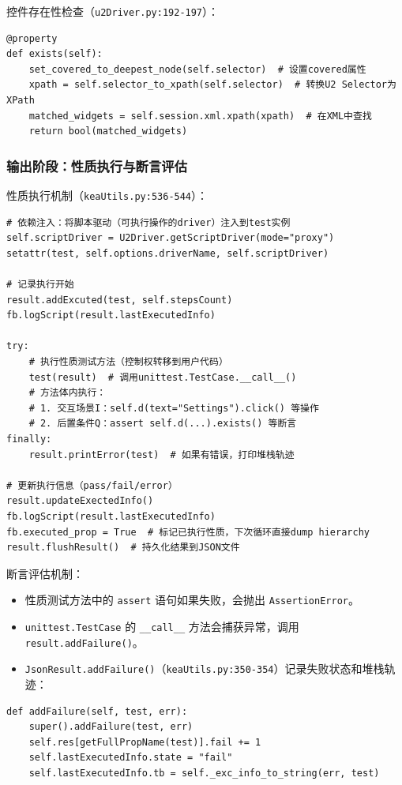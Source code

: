 \documentclass[a4paper, zihao=-4]{ctexart}
\newcommand{\bff}[1]{{\heiti #1}}
\begin{document}
\bff{控件存在性检查}（\texttt{u2Driver.py:192-197}）：

\begin{lstlisting}
@property
def exists(self):
    set_covered_to_deepest_node(self.selector)  # 设置covered属性
    xpath = self.selector_to_xpath(self.selector)  # 转换U2 Selector为XPath
    matched_widgets = self.session.xml.xpath(xpath)  # 在XML中查找
    return bool(matched_widgets)
\end{lstlisting}

\subsubsection{输出阶段：性质执行与断言评估}

\bff{性质执行机制}（\texttt{keaUtils.py:536-544}）：

\begin{lstlisting}
# 依赖注入：将脚本驱动（可执行操作的driver）注入到test实例
self.scriptDriver = U2Driver.getScriptDriver(mode="proxy")
setattr(test, self.options.driverName, self.scriptDriver)

# 记录执行开始
result.addExcuted(test, self.stepsCount)
fb.logScript(result.lastExecutedInfo)

try:
    # 执行性质测试方法（控制权转移到用户代码）
    test(result)  # 调用unittest.TestCase.__call__()
    # 方法体内执行：
    # 1. 交互场景I：self.d(text="Settings").click() 等操作
    # 2. 后置条件Q：assert self.d(...).exists() 等断言
finally:
    result.printError(test)  # 如果有错误，打印堆栈轨迹

# 更新执行信息（pass/fail/error）
result.updateExectedInfo()
fb.logScript(result.lastExecutedInfo)
fb.executed_prop = True  # 标记已执行性质，下次循环直接dump hierarchy
result.flushResult()  # 持久化结果到JSON文件
\end{lstlisting}

\bff{断言评估机制}：

\begin{itemize}
    \item 性质测试方法中的 \texttt{assert} 语句如果失败，会抛出 \texttt{AssertionError}。
    \item \texttt{unittest.TestCase} 的 \texttt{\_\_call\_\_} 方法会捕获异常，调用 \texttt{result.addFailure()}。
    \item \texttt{JsonResult.addFailure()}（\texttt{keaUtils.py:350-354}）记录失败状态和堆栈轨迹：
\end{itemize}

\begin{lstlisting}
def addFailure(self, test, err):
    super().addFailure(test, err)
    self.res[getFullPropName(test)].fail += 1
    self.lastExecutedInfo.state = "fail"
    self.lastExecutedInfo.tb = self._exc_info_to_string(err, test)
\end{lstlisting}
\end{document}
